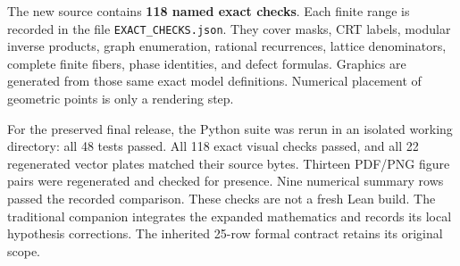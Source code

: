 The new source contains \textbf{118 named exact checks}. Each finite range is recorded in the file \texttt{EXACT\_CHECKS.json}. They cover masks, CRT labels, modular inverse products, graph enumeration, rational recurrences, lattice denominators, complete finite fibers, phase identities, and defect formulas. Graphics are generated from those same exact model definitions. Numerical placement of geometric points is only a rendering step.

For the preserved final release, the Python suite was rerun in an isolated working directory: all 48 tests passed. All 118 exact visual checks passed, and all 22 regenerated vector plates matched their source bytes. Thirteen PDF/PNG figure pairs were regenerated and checked for presence. Nine numerical summary rows passed the recorded comparison. These checks are not a fresh Lean build. The traditional companion integrates the expanded mathematics and records its local hypothesis corrections. The inherited 25-row formal contract retains its original scope.

